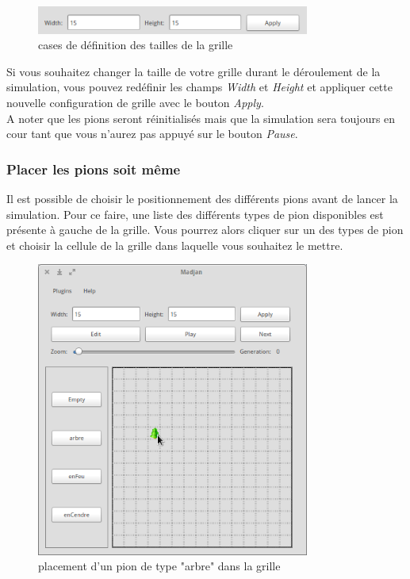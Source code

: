 \documentclass[pdftex,12pt,a4paper]{article}
\begin{document}
    \begin{figure}[htb]
        	\begin{center}
        	\includegraphics[width=0.8\textwidth]{./images/tailleGrille.png}\caption{\label{fig:tailleGrille} cases de définition des tailles de la grille}
             \end{center}
      	\end{figure}
      	
      	\FloatBarrier
    
    Si vous souhaitez changer la taille de votre grille durant le déroulement de la simulation, vous pouvez redéfinir les champs \emph{Width} et \emph{Height} et appliquer cette nouvelle configuration de grille avec le bouton \emph{Apply}. \\ A noter que les pions seront réinitialisés mais que la simulation sera toujours en cour tant que vous n'aurez pas appuyé sur le bouton \emph{Pause}.
    	\newpage
        \subsubsection{Placer les pions soit même}
        
    Il est possible de choisir le positionnement des différents pions avant de lancer la simulation. Pour ce faire, une liste des différents types de pion disponibles est présente à gauche de la grille.    
    Vous pourrez alors cliquer sur un des types de pion et choisir la cellule de la grille dans laquelle vous souhaitez le mettre.
    
		\begin{figure}[htb]
        	\begin{center}
        	\includegraphics[width=0.8\textwidth]{./images/placementPion.png}\caption{\label{fig:placementPion} placement d'un pion de type "arbre" dans la grille}
             \end{center}
      	\end{figure}
      	
\end{document}
